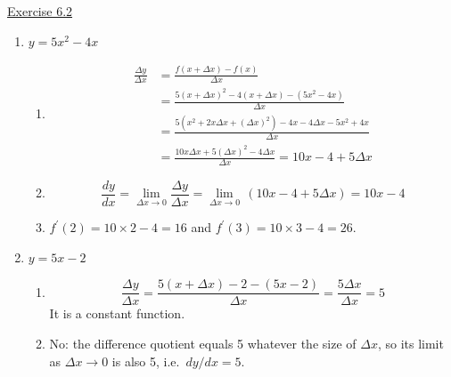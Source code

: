 \underline{Exercise 6.2}
\begin{enumerate}
\item[2.] $y=5 x^{2}-4 x$
\begin{enumerate}
\item[(a)]
\[
\begin{aligned}
\frac{\Delta y}{\Delta x} &=\frac{f(x+\Delta x)-f(x)}{\Delta x} \\
&=\frac{5(x+\Delta x)^{2}-4(x+\Delta x)-\left(5 x^{2}-4 x\right)}{\Delta x} \\
&=\frac{5\left(x^{2}+2 x \Delta x+(\Delta x)^{2}\right)-4 x-4 \Delta x-5 x^{2}+4 x}{\Delta x} \\
&=\frac{10 x \Delta x+5 (\Delta x)^{2}-4 \Delta x}{\Delta x}=10 x-4+5 \Delta x
\end{aligned}
\]
\item[(b)] \[\frac{d y}{d x}=\lim _{\Delta x \rightarrow 0} \frac{\Delta y}{\Delta x}=\lim _{\Delta x \rightarrow 0}\,(10 x-4+5 \Delta x)=10 x-4\]
\item[(c)] $f^{\prime}(2)=10 \times 2-4=16$ and $f^{\prime}(3)=10 \times 3-4=26$.
\end{enumerate}

\item[3.] $y=5 x-2$
\begin{enumerate}
\item[(a)] \[\frac{\Delta y}{\Delta x}=\frac{5(x+\Delta x)-2-(5 x-2)}{\Delta x}=\frac{5 \Delta x}{\Delta x}=5\]
It is a constant function.
\item[(b)] No: the difference quotient equals 5 whatever the size of $\Delta x$, so its limit as $\Delta x \rightarrow 0$ is also 5, i.e.\ $d y / d x=5$.
\end{enumerate}
\end{enumerate}

